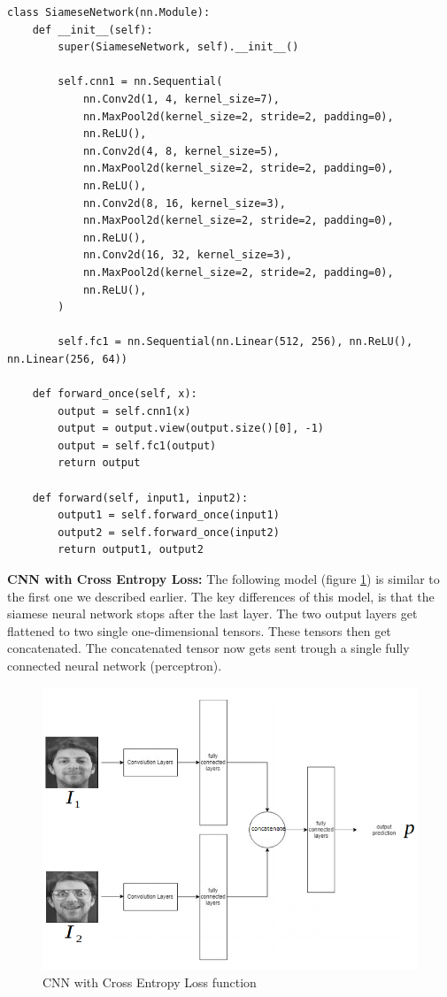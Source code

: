 \begin{lstlisting}[caption={Code for CNN with Contrastive Loss}, label={lst:cnncl}, frame=single, breaklines=true]
class SiameseNetwork(nn.Module):
    def __init__(self):
        super(SiameseNetwork, self).__init__()

        self.cnn1 = nn.Sequential(
            nn.Conv2d(1, 4, kernel_size=7),
            nn.MaxPool2d(kernel_size=2, stride=2, padding=0),
            nn.ReLU(),
            nn.Conv2d(4, 8, kernel_size=5),
            nn.MaxPool2d(kernel_size=2, stride=2, padding=0),
            nn.ReLU(),
            nn.Conv2d(8, 16, kernel_size=3),
            nn.MaxPool2d(kernel_size=2, stride=2, padding=0),
            nn.ReLU(),
            nn.Conv2d(16, 32, kernel_size=3),
            nn.MaxPool2d(kernel_size=2, stride=2, padding=0),
            nn.ReLU(),
        )

        self.fc1 = nn.Sequential(nn.Linear(512, 256), nn.ReLU(), nn.Linear(256, 64))

    def forward_once(self, x):
        output = self.cnn1(x)
        output = output.view(output.size()[0], -1)
        output = self.fc1(output)
        return output

    def forward(self, input1, input2):
        output1 = self.forward_once(input1)
        output2 = self.forward_once(input2)
        return output1, output2
\end{lstlisting}

\textbf{CNN with Cross Entropy Loss:} The following model (figure \ref{fig:cnncel}) is similar to the first one we described earlier. The key differences of this model, is that the siamese neural network stops after the last layer. The two output layers get flattened to two single one-dimensional tensors. These tensors then get concatenated. The concatenated tensor now gets sent trough a single fully connected neural network (perceptron).\\

\begin{figure}[H]
  \includegraphics[scale=0.7]{fig/cnncel.png}
  \centering
  \caption{CNN with Cross Entropy Loss function}
  \label{fig:cnncel}
\end{figure}

